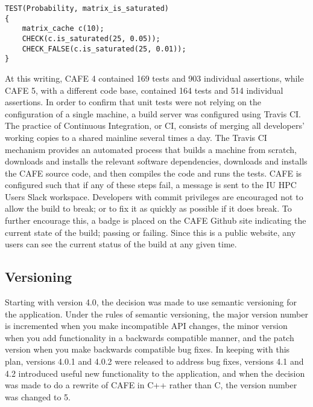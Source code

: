 \documentclass[acmtog, authorversion]{acmart}
\begin{document}
\begin{lstlisting}
TEST(Probability, matrix_is_saturated)
{
    matrix_cache c(10);
    CHECK(c.is_saturated(25, 0.05));
    CHECK_FALSE(c.is_saturated(25, 0.01));
}
\end{lstlisting}

At this writing, CAFE 4 contained 169 tests and 903 individual assertions, while CAFE 5, with a different code base, contained 164 tests and 514 individual assertions. In order to confirm that unit tests were not relying on the configuration of a single machine, a build server was configured using Travis CI. The practice of Continuous Integration, or CI, consists of merging all developers' working copies to a shared mainline several times a day. The Travis CI mechanism provides an automated process that builds a machine from scratch, downloads and installs the relevant software dependencies, downloads and installs the CAFE source code, and then compiles the code and runs the tests. CAFE is configured such that if any of these steps fail, a message is sent to the IU HPC Users Slack workspace. Developers with commit privileges are encouraged not to allow the build to break; or to fix it as quickly as possible if it does break. To further encourage this, a badge is placed on the CAFE Github site indicating the current state of the build; passing or failing. Since this is a public website, any users can see the current status of the build at any given time.

\subsection{Versioning}
    Starting with version 4.0, the decision was made to use semantic versioning for the application. Under the rules of semantic versioning, the major version number is incremented when you make incompatible API changes, the minor version when you add functionality in a backwards compatible manner, and the patch version when you make backwards compatible bug fixes. In keeping with this plan, versions 4.0.1 and 4.0.2 were released to address bug fixes, versions 4.1 and 4.2 introduced useful new functionality to the application, and when the decision was made to do a rewrite of CAFE in C++ rather than C, the version number was changed to 5.
\end{document}
